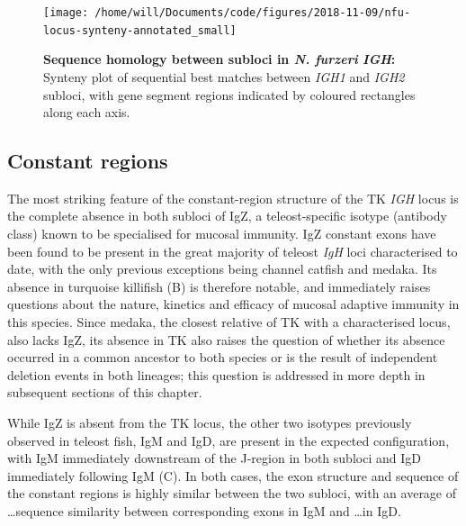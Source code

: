 	\begin{figure}
	\centering
	\texttt{[image: /home/will/Documents/code/figures/2018-11-09/nfu-locus-synteny-annotated\_small]}
	\caption[Sequence homology between subloci in \textit{N. furzeri} \textit{IGH}]{\textbf{Sequence homology between subloci in \textit{N. furzeri} \textit{IGH}:} Synteny plot of sequential best matches between \textit{IGH1} and \textit{IGH2} subloci, with gene segment regions indicated by coloured rectangles along each axis.}
	\label{fig:nfu-locus-synteny}
	\end{figure}
	
	\subsection{Constant regions}
	\label{sec:nfu-constant}
	
	The most striking feature of the constant-region structure of the TK \textit{IGH} locus is the complete absence in both subloci of IgZ, a teleost-specific isotype (antibody class) known to be specialised for mucosal immunity. IgZ constant exons have been found to be present in the great majority of teleost \textit{IgH} loci characterised to date, with the only previous exceptions being channel catfish and medaka. Its absence in turquoise killifish (B) is therefore notable, and immediately raises questions about the nature, kinetics and efficacy of mucosal adaptive immunity in this species. Since medaka, the closest relative of TK with a characterised locus, also lacks IgZ, its absence in TK also raises the question of whether its absence occurred in a common ancestor to both species or is the result of independent deletion events in both lineages; this question is addressed in more depth in subsequent sections of this chapter. %
	
	While IgZ is absent from the TK locus, the other two isotypes previously observed in teleost fish, IgM and IgD, are present in the expected configuration, with IgM immediately downstream of the J-region in both subloci and IgD immediately following IgM (C). In both cases, the exon structure and sequence of the constant regions is highly similar between the two subloci, with an average of \dots sequence similarity between corresponding exons in IgM and \dots in IgD. %
	

